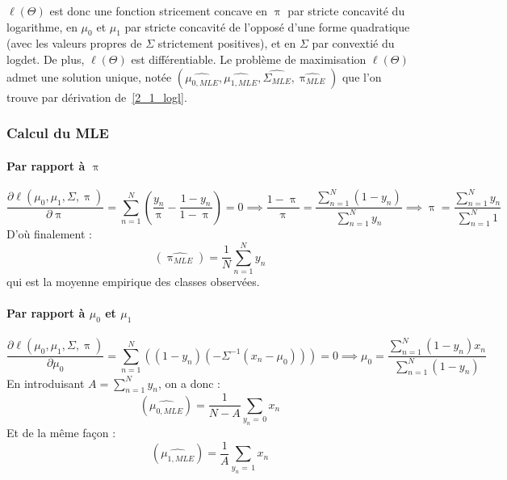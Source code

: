 \documentclass[12pt,a4paper,onecolumn]{article}
\begin{document}
\( \ell(\Theta) \) est donc une fonction stricement concave en \( \uppi\) par stricte concavité du logarithme, en \( \mu_0 \) et \( \mu_1 \) par stricte concavité de l'opposé d'une forme quadratique (avec les valeurs propres de  \( \Sigma \) strictement positives), et en \( \Sigma \) par convextié du logdet.
De plus, \( \ell(\Theta) \) est différentiable. Le problème de maximisation \( \ell(\Theta) \) admet une solution unique, notée \( (\widehat{\mu_{0, MLE}}, \widehat{\mu_{1, MLE}}, \widehat{\Sigma_{MLE}}, \widehat{\uppi_{MLE}}) \) que l'on trouve par dérivation de~\eqref{2_1_logl}.

\subsubsection{Calcul du MLE}
\paragraph*{Par rapport à \protect \(\uppi \)}

\[
	\frac{\partial \ell(\mu_0, \mu_1, \Sigma, \uppi)}{\partial \uppi} = 	\sum_{n = 1}^N\left( \frac{y_n}{\uppi} - \frac{1 - y_n}{1 - \uppi} \right) = 0
	\implies \frac{1- \uppi}{\uppi} = \frac{\sum_{n = 1}^N (1 - y_n)}{\sum_{n = 1}^N y_n}
	\implies \uppi = \frac{\sum_{n = 1}^N y_n}{\sum_{n = 1}^N 1}
\]
D'où finalement :
\begin{equation}
	\left(\widehat{\uppi_{MLE}}\right) = \frac{1}{N}\sum_{n = 1}^N y_n
	\label{2_1_pi}
\end{equation}
qui est la moyenne empirique des classes observées.

\paragraph*{Par rapport à \protect \(\mu_0 \) et \protect \(\mu_1 \)}
\[
	\frac{\partial \ell(\mu_0, \mu_1, \Sigma, \uppi)}{\partial \mu_0} = 	\sum_{n = 1}^N\left((1 - y_n)(- \Sigma^{-1}(x_n - \mu_0)) \right) = 0
	\implies \mu_0 = \frac{\sum_{n = 1}^N (1 - y_n)x_n}{\sum_{n = 1}^N (1 - y_n)}
\]
En introduisant \( A = \sum_{n = 1}^N y_n\), on a donc :
\begin{equation}
	\left(\widehat{\mu_{0,MLE}}\right) = \frac{1}{N - A}\sum_{y_n =\,0} x_n
	\label{2_1_mu0}
\end{equation}
Et de la même façon :
\begin{equation}
	\left(\widehat{\mu_{1,MLE}}\right) = \frac{1}{A}\sum_{y_n =\,1} x_n
	\label{2_1_mu1}
\end{equation}
\end{document}
